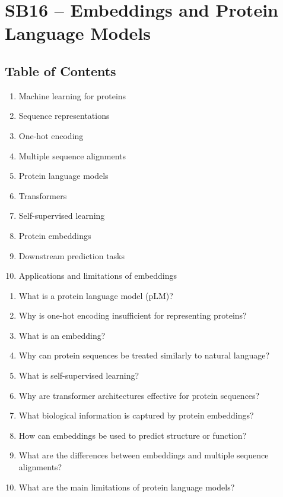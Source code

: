 \section{SB16 -- Embeddings and Protein Language Models}

\subsection*{Table of Contents}

\begin{enumerate}
\item Machine learning for proteins
\item Sequence representations
\item One-hot encoding
\item Multiple sequence alignments
\item Protein language models
\item Transformers
\item Self-supervised learning
\item Protein embeddings
\item Downstream prediction tasks
\item Applications and limitations of embeddings
\end{enumerate}


\begin{enumerate}
\item{What is a protein language model (pLM)?}
\item{Why is one-hot encoding insufficient for representing proteins?}
\item{What is an embedding?}
\item{Why can protein sequences be treated similarly to natural language?}
\item{What is self-supervised learning?}
\item{Why are transformer architectures effective for protein sequences?}
\item{What biological information is captured by protein embeddings?}
\item{How can embeddings be used to predict structure or function?}
\item{What are the differences between embeddings and multiple sequence alignments?}
\item{What are the main limitations of protein language models?}
\end{enumerate}